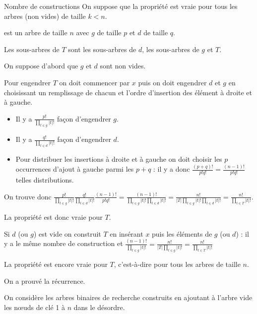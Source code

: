 \begin{exo}{Nombre de constructions}{}
On suppose que la propriété est vraie pour tous les arbres (non vides) de taille $k < n$.

 est un arbre de taille $n$ avec $g$ de taille $p$ et $d$ de taille $q$.

Les sous-arbres de $T$ sont les sous-arbres de $d$, les sous-arbres de $g$ et $T$.

On suppose d'abord que $g$ et $d$ sont non vides.

Pour engendrer $T$ on doit commencer par $x$ puis on doit engendrer $d$ et $g$ en choisissant un remplissage de chacun et l'ordre d'insertion des élément à droite et à gauche. 

\begin{itemize}
\item Il y a $\displaystyle \frac {p!}{\displaystyle \prod_{t\in g}|t|!}$ façon d'engendrer $g$.
\item Il y a $\displaystyle \frac {q!}{\displaystyle \prod_{t\in d}|t|!}$ façon d'engendrer $d$.
\item Pour distribuer les insertions à droite et à gauche on doit choisir les $p$ occurrences d'ajout à gauche parmi les $p+q$ : il y a donc $\displaystyle \frac {(p+q)!}{p!q!}=\frac {(n-1)!}{p!q!}$ telles distributions.
\end{itemize}

On trouve donc $\displaystyle \frac {p!}{\displaystyle \prod_{t\in g}|t|!}
\frac {q!}{\displaystyle \prod_{t\in d}|t|!}
\frac {(n-1)!}{p!q!}
=\frac {(n-1)!}{\displaystyle \prod_{t\in g}|t|!\prod_{t\in d}|t|!}
=\frac {n!}{\displaystyle |T|\prod_{t\in g}|t|!\prod_{t\in d}|t|!}
=\frac {n!}{\displaystyle \prod_{t\in T}|t|!}$.

La propriété est donc vraie pour $T$.

Si $d$ (ou $g$) est vide on construit $T$ en insérant $x$ puis les éléments de $g$ (ou $d$) : il y a le même nombre de construction et $\displaystyle \frac {(n-1)!}{\displaystyle \prod_{t\in g}|t|!}
=\frac {n!}{\displaystyle |T|\prod_{t\in g}|t|!}
=\frac {n!}{\displaystyle \prod_{t\in T}|t|!}$

La propriété est encore vraie pour $T$, c'est-à-dire pour tous les arbres de taille $n$.

On a prouvé la récurrence.
\end{exo}

\medskip
On considère les arbres binaires de recherche construits en ajoutant à l'arbre vide les nœuds de clé 1 à $n$ dans le désordre.

